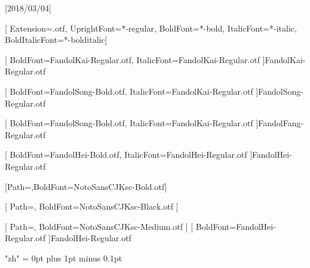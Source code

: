 
[2018/03/04]

\setsansfont{texgyreheros}[     %
Extension=.otf,
UprightFont=*-regular,
BoldFont=*-bold,
ItalicFont=*-italic,
BoldItalicFont=*-bolditalic]





[
	BoldFont=FandolKai-Regular.otf, ItalicFont=FandolKai-Regular.otf
]{FandolKai-Regular.otf}

[
	BoldFont=FandolSong-Bold.otf,
	ItalicFont=FandolKai-Regular.otf
]{FandolSong-Regular.otf}

[
	BoldFont=FandolSong-Bold.otf,
	ItalicFont=FandolKai-Regular.otf
]{FandolFang-Regular.otf}

[
	BoldFont=FandolHei-Bold.otf,
	ItalicFont=FandolHei-Regular.otf
]{FandolHei-Regular.otf}

[Path=\AJNotoSansFolder,BoldFont=NotoSansCJKsc-Bold.otf]{\AJNotoSansRegular}

[
	Path=\AJNotoSansFolder,
	BoldFont=NotoSansCJKsc-Black.otf
]{\AJNotoSansRegular}

[
	Path=\AJNotoSansFolder,
	BoldFont=NotoSansCJKsc-Medium.otf
]{\AJNotoSansRegular}	%
[
	BoldFont=FandolHei-Regular.otf
]{FandolHei-Regular.otf}	%

\XeTeXlinebreaklocale "zh"
\XeTeXlinebreakskip = 0pt plus 1pt minus 0.1pt

\newcommand\kaishu{\CJKfamily{kai}} %
\newcommand\songti{\CJKfamily{song}} %
\newcommand\heiti{\CJKfamily{hei}}	%
\newcommand\thmheiti{\CJKfamily{hei2}}	%
\newcommand\fangsong{\CJKfamily{fangsong}} %
\renewcommand{\em}{\bfseries\CJKfamily{emfont}} %
